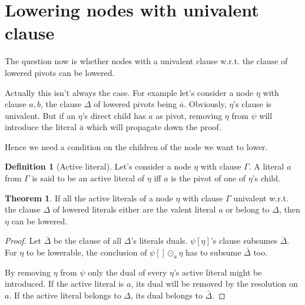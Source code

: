 \documentclass[a4paper]{article}
\theoremstyle{definition}
\newtheorem{thm}{Theorem}
\newtheorem{defn}{Definition}
\begin{document}
\section{Lowering nodes with univalent clause}

The question now is whether nodes with a univalent clause w.r.t. the clause of
lowered pivots can be lowered.

Actually this isn't always the case. For example let's consider a node
$\eta$ with clause $a,b$, the clause $\Delta$ of lowered pivots being
$\bar{a}$. Obviously, $\eta$'s clause is univalent. But if an $\eta$'s
direct child has $a$ as pivot, removing $\eta$ from $\psi$ will introduce
the literal $\bar{a}$ which will propagate down the proof.

Hence we need a condition on the children of the node we want to lower.

\begin{defn}[Active literal]
Let's consider a node $\eta$ with clause $\Gamma$. A literal $a$ from
$\Gamma$ is said to be an active literal of $\eta$ iff $a$ is the pivot of
one of $\eta$'s child.
\end{defn}

\begin{thm}
If all the active literals of a node $\eta$ with clause $\Gamma$ univalent
w.r.t. the clause $\Delta$ of lowered literals either are the valent
literal $a$ or belong to $\Delta$, then $\eta$ can be lowered.
\end{thm}

\begin{proof}
Let $\bar{\Delta}$ be the clause of all $\Delta$'s literals duals.
$\psi[\eta]$'s clause subsumes $\bar{\Delta}$. For $\eta$ to be lowerable,
the conclusion of $\psi[] \odot_a \eta$ has to subsume $\bar{\Delta}$ too.

By removing $\eta$ from $\psi$ only the dual of every $\eta$'s active literal
might be introduced. If the active literal is $a$, its dual will be removed
by the resolution on $a$. If the active literal belongs to $\Delta$, its
dual belongs to $\bar{\Delta}$.
\end{proof}
\end{document}

